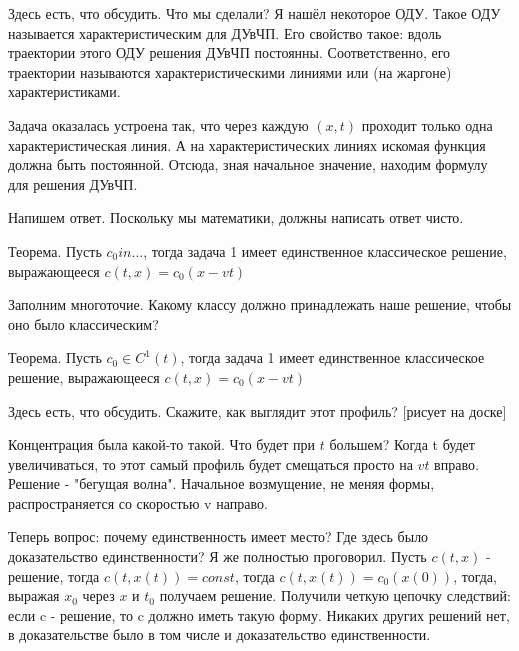 Здесь есть, что обсудить. Что мы сделали? Я нашёл некоторое ОДУ. Такое ОДУ называется характеристическим для ДУвЧП. Его свойство такое: вдоль траектории этого ОДУ решения ДУвЧП постоянны. Соответственно, его траектории называются характеристическими линиями или (на жаргоне) характеристиками.

Задача оказалась устроена так, что через каждую $(x,t)$ проходит только одна характеристическая линия. А на характеристических линиях искомая функция должна быть постоянной. Отсюда, зная начальное значение, находим формулу для решения ДУвЧП.

Напишем ответ. Поскольку мы математики, должны написать ответ чисто.

Теорема. Пусть $c_0 in ...$, тогда задача 1 имеет единственное классическое решение, выражающееся $c(t,x) = c_0(x - vt)$
 
Заполним многоточие. Какому классу должно принадлежать наше решение, чтобы оно было классическим? 

Теорема. Пусть $c_0 \in C^1(t)$, тогда задача 1 имеет единственное классическое решение, выражающееся $c(t,x) = c_0(x - vt)$


Здесь есть, что обсудить. Скажите, как выглядит этот профиль? [рисует на доске]

Концентрация была какой-то такой. Что будет при $t$ большем? Когда t будет увеличиваться, то этот самый профиль будет смещаться просто на $vt$ вправо. Решение - "бегущая волна". Начальное возмущение, не меняя формы, распространяется со скоростью v направо.

Теперь вопрос: почему единственность имеет место? Где здесь было доказательство единственности? Я же полностью проговорил. Пусть $c(t,x)$ - решение, тогда $c(t,x(t)) = const$, тогда $c(t,x(t)) = c_0(x(0))$, тогда, выражая $x_0$ через $x$ и $t_0$ получаем решение. Получили четкую цепочку следствий: если c - решение, то c должно иметь такую форму. Никаких других решений нет, в доказательстве было в том числе и доказательство единственности.

